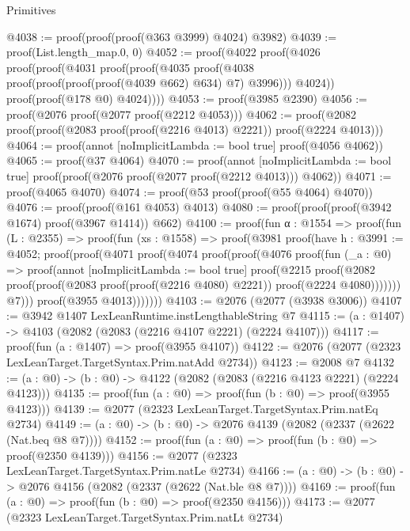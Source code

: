 \begin{lexlean}{Primitives}
\begin{coremodule}
@4038 := proof(proof(proof(@363 @3999) @4024) @3982)
@4039 := proof(List.length_map.{0, 0})
@4052 := proof(@4022
      proof(@4026
          proof(proof(@4031
                proof(proof(@4035 proof(@4038 proof(proof(proof(proof(@4039 @662) @634) @7) @3996)))
                    @4024))
              proof(proof(@178 @0) @4024))))
@4053 := proof(@3985 @2390)
@4056 := proof(@2076 proof(@2077 proof(@2212 @4053)))
@4062 := proof(@2082 proof(proof(@2083 proof(proof(@2216 @4013) @2221)) proof(@2224 @4013)))
@4064 := proof(annot [noImplicitLambda := bool true] proof(@4056 @4062))
@4065 := proof(@37 @4064)
@4070 := proof(annot [noImplicitLambda := bool true]
    proof(proof(@2076 proof(@2077 proof(@2212 @4013))) @4062))
@4071 := proof(@4065 @4070)
@4074 := proof(@53 proof(proof(@55 @4064) @4070))
@4076 := proof(proof(@161 @4053) @4013)
@4080 := proof(proof(proof(@3942 @1674) proof(@3967 @1414)) @662)
@4100 := proof(fun {α : @1554} =>
    proof(fun (L : @2355) =>
      proof(fun (xs : @1558) =>
        proof(@3981
            proof(have h : @3991 := @4052;
              proof(proof(@4071
                    proof(@4074
                        proof(proof(@4076
                              proof(fun (_a : @0) =>
                                proof(annot [noImplicitLambda := bool true]
                                  proof(@2215
                                      proof(@2082
                                          proof(proof(@2083 proof(proof(@2216 @4080) @2221))
                                              proof(@2224 @4080)))))))
                            @7)))
                  proof(@3955 @4013)))))))
@4103 := @2076 (@2077 (@3938 @3006))
@4107 := @3942 @1407 LexLeanRuntime.instLengthableString @7
@4115 := (a : @1407) -> @4103 (@2082 (@2083 (@2216 @4107 @2221) (@2224 @4107)))
@4117 := proof(fun (a : @1407) => proof(@3955 @4107))
@4122 := @2076 (@2077 (@2323 LexLeanTarget.TargetSyntax.Prim.natAdd @2734))
@4123 := @2008 @7
@4132 := (a : @0) -> (b : @0) -> @4122 (@2082 (@2083 (@2216 @4123 @2221) (@2224 @4123)))
@4135 := proof(fun (a : @0) => proof(fun (b : @0) => proof(@3955 @4123)))
@4139 := @2077 (@2323 LexLeanTarget.TargetSyntax.Prim.natEq @2734)
@4149 := (a : @0) -> (b : @0) -> @2076 @4139 (@2082 (@2337 (@2622 (Nat.beq @8 @7))))
@4152 := proof(fun (a : @0) => proof(fun (b : @0) => proof(@2350 @4139)))
@4156 := @2077 (@2323 LexLeanTarget.TargetSyntax.Prim.natLe @2734)
@4166 := (a : @0) -> (b : @0) -> @2076 @4156 (@2082 (@2337 (@2622 (Nat.ble @8 @7))))
@4169 := proof(fun (a : @0) => proof(fun (b : @0) => proof(@2350 @4156)))
@4173 := @2077 (@2323 LexLeanTarget.TargetSyntax.Prim.natLt @2734)

\end{coremodule}
\end{lexlean}
